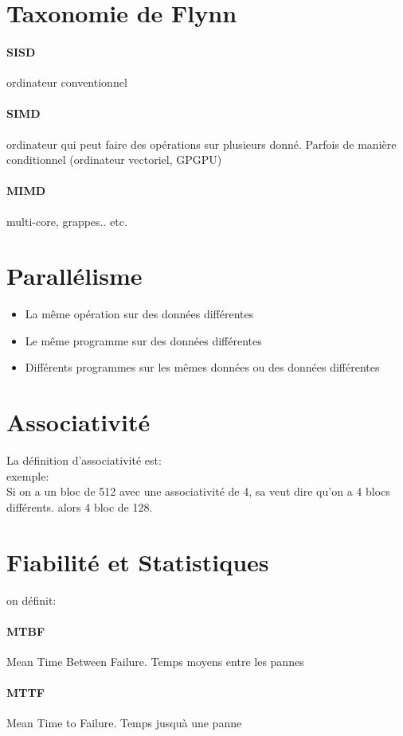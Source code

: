 \documentclass[oneside]{book}
\begin{document}
\section{Taxonomie de Flynn}
\paragraph{SISD}
ordinateur conventionnel
\paragraph{SIMD}
ordinateur qui peut faire des opérations sur plusieurs donné. Parfois de manière conditionnel (ordinateur vectoriel, GPGPU)
\paragraph{MIMD}
multi-core, grappes.. etc.

\section{Parallélisme}
\begin{itemize}
\item La même opération sur des données différentes
\item Le même programme sur des données différentes
\item Différents programmes sur les mêmes données ou des données différentes
\end{itemize}
\section{Associativité}
La définition d'associativité est:\\

exemple: \\
Si on a un bloc de 512 avec une associativité de 4, sa veut dire qu'on a 4 blocs différents. alors 4 bloc de 128.
\section{Fiabilité et Statistiques}
on définit:
\paragraph{MTBF} Mean Time Between Failure. Temps moyens entre les pannes
\paragraph{MTTF} Mean Time to Failure. Temps jusquà une panne
\end{document}
